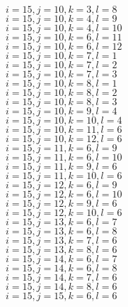 \documentclass[14pt]{article}
\begin{document}
    $i=15,j=10,k=3,l=8 $ \\ 
    $i=15,j=10,k=4,l=9 $ \\ 
    $i=15,j=10,k=4,l=10 $ \\ 
    $i=15,j=10,k=6,l=11 $ \\ 
    $i=15,j=10,k=6,l=12 $ \\ 
    $i=15,j=10,k=7,l=1 $ \\ 
    $i=15,j=10,k=7,l=2 $ \\ 
    $i=15,j=10,k=7,l=3 $ \\ 
    $i=15,j=10,k=8,l=1 $ \\ 
    $i=15,j=10,k=8,l=2 $ \\ 
    $i=15,j=10,k=8,l=3 $ \\ 
    $i=15,j=10,k=9,l=4 $ \\ 
    $i=15,j=10,k=10,l=4 $ \\ 
    $i=15,j=10,k=11,l=6 $ \\ 
    $i=15,j=10,k=12,l=6 $ \\ 
    $i=15,j=11,k=6,l=9 $ \\ 
    $i=15,j=11,k=6,l=10 $ \\ 
    $i=15,j=11,k=9,l=6 $ \\ 
    $i=15,j=11,k=10,l=6 $ \\ 
    $i=15,j=12,k=6,l=9 $ \\ 
    $i=15,j=12,k=6,l=10 $ \\ 
    $i=15,j=12,k=9,l=6 $ \\ 
    $i=15,j=12,k=10,l=6 $ \\ 
    $i=15,j=13,k=6,l=7 $ \\ 
    $i=15,j=13,k=6,l=8 $ \\ 
    $i=15,j=13,k=7,l=6 $ \\ 
    $i=15,j=13,k=8,l=6 $ \\ 
    $i=15,j=14,k=6,l=7 $ \\ 
    $i=15,j=14,k=6,l=8 $ \\ 
    $i=15,j=14,k=7,l=6 $ \\ 
    $i=15,j=14,k=8,l=6 $ \\ 
    $i=15,j=15,k=6,l=6 $ \\ 
    
\end{document}

